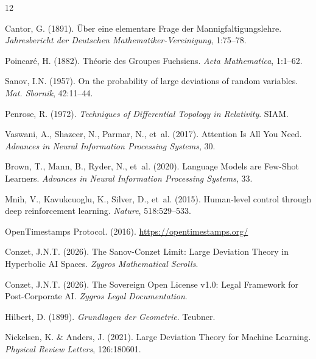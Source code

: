\documentclass[11pt,a4paper]{article}
\begin{document}

\begin{thebibliography}{12}

Cantor, G. (1891).
\newblock Über eine elementare Frage der Mannigfaltigungslehre.
\newblock \textit{Jahresbericht der Deutschen Mathematiker-Vereinigung}, 1:75--78.

Poincaré, H. (1882).
\newblock Théorie des Groupes Fuchsiens.
\newblock \textit{Acta Mathematica}, 1:1--62.

Sanov, I.N. (1957).
\newblock On the probability of large deviations of random variables.
\newblock \textit{Mat. Sbornik}, 42:11--44.

Penrose, R. (1972).
\newblock \textit{Techniques of Differential Topology in Relativity}.
\newblock SIAM.

Vaswani, A., Shazeer, N., Parmar, N., et~al. (2017).
\newblock Attention Is All You Need.
\newblock \textit{Advances in Neural Information Processing Systems}, 30.

Brown, T., Mann, B., Ryder, N., et~al. (2020).
\newblock Language Models are Few-Shot Learners.
\newblock \textit{Advances in Neural Information Processing Systems}, 33.

Mnih, V., Kavukcuoglu, K., Silver, D., et~al. (2015).
\newblock Human-level control through deep reinforcement learning.
\newblock \textit{Nature}, 518:529--533.

OpenTimestamps Protocol. (2016).
\newblock \url{https://opentimestamps.org/}

Conzet, J.N.T. (2026).
\newblock The Sanov-Conzet Limit: Large Deviation Theory in Hyperbolic AI Spaces.
\newblock \textit{Zygros Mathematical Scrolls}.

Conzet, J.N.T. (2026).
\newblock The Sovereign Open License v1.0: Legal Framework for Post-Corporate AI.
\newblock \textit{Zygros Legal Documentation}.

Hilbert, D. (1899).
\newblock \textit{Grundlagen der Geometrie}.
\newblock Teubner.

Nickelsen, K. \& Anders, J. (2021).
\newblock Large Deviation Theory for Machine Learning.
\newblock \textit{Physical Review Letters}, 126:180601.

\end{thebibliography}
\end{document}

